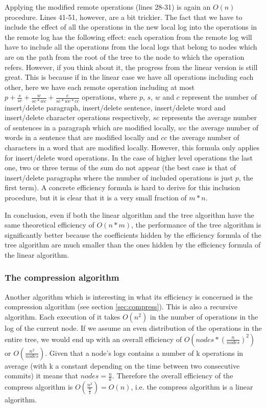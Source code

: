 Applying the modified remote operations (lines 28-31) is again an $O(n)$ procedure. Lines 41-51, however,
are a bit trickier. The fact that we have to include the effect of all the operations in the new local log
into the operations in the remote log has the following effect: each operation from the remote log will
have to include all the operations from the local logs that belong to nodes which are on the path from
the root of the tree to the node to which the operation refers. However, if you think about it, the
progress from the linear version is still great. This is because if in the linear case we have all operations
including each other, here we have each remote operation including at most $p + \frac{s}{sc} + \frac{w}{sc*wc} +
\frac{c}{sc*wc*cc}$ operations, where $p$, $s$, $w$ and $c$ represent the number of insert/delete paragraph,
insert/delete sentence, insert/delete word and insert/delete character operations respectively, $sc$ represents
the average number of sentences in a paragraph which are modified locally, $wc$ the average number of words
in a sentence that are modified locally and $cc$ the average number of characters in a word that are modified
locally. However, this formula only applies for insert/delete word operations. In the case of higher level
operations the last one, two or three terms of the sum do not appear (the best case is that of insert/delete
paragraphs where the number of included operations is just $p$, the first term). A concrete efficiency
formula is hard to derive for this inclusion procedure, but it is clear that it is a very small fraction
of $m*n$.

In conclusion, even if both the linear algorithm and the tree algorithm have the same theoretical efficiency
of $O(n*m)$, the performance of the tree algorithm is significantly better because the coefficients hidden
by the efficiency formula of the tree algorithm are much smaller than the ones hidden by the efficiency
formula of the linear algorithm.

\subsubsection{The compression algorithm}

Another algorithm which is interesting in what its efficiency is concerned is the compression algorithm
(see section \ref{sec:compress}). This is also a recursive algorithm. Each execution of it takes $O(n^2)$
in the number of operations in the log of the current node. If we assume an even distribution of the
operations in the entire tree, we would end up with an overall efficiency of $O(nodes*(\frac{n}{nodes})^2)$
or $O(\frac{n^2}{nodes})$. Given that a node's logs contains a number of k operations in average (with
k a constant depending on the time between two consecutive commits) it means that $nodes = \frac{n}{k}$.
Therefore the overall efficiency of the compress algorithm is $O(\frac{n^2}{\frac{n}{k}}) = O(n)$, i.e.
the compress algorithm is a linear algorithm.

